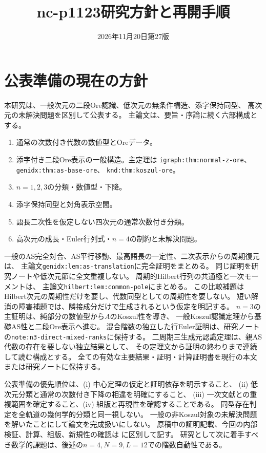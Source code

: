 \documentclass[11pt,a4paper]{ltjsarticle}
\title{nc-p1123研究方針と再開手順}
\author{}
\date{2026年11月20日\quad 第27版}
\begin{document}
\maketitle

\section{公表準備の現在の方針}
本研究は、一般次元の二段Ore認識、低次元の無条件構造、添字保持同型、
高次元の未解決問題を区別して公表する。
主論文は、要旨・序論に続く六部構成とする。
\begin{enumerate}
\item 通常の次数付き代数の数値型とOreデータ。
\item 添字付き二段Ore表示の一般構造。主定理は
\texttt{igraph:thm:normal-z-ore}、\texttt{genidx:thm:as-base-ore}、
\texttt{knd:thm:koszul-ore}。
\item $n=1,2,3$の分類・数値型・下降。
\item 添字保持同型と対角表示空間。
\item 語長二次性を仮定しない四次元の通常次数付き分類。
\item 高次元の成長・Euler行列式・$n=4$の制約と未解決問題。
\end{enumerate}
一般のAS完全対合、AS平行移動、最高語長の一定性、二次表示からの周期復元は、
主論文\texttt{genidx:lem:as-translation}に完全証明をまとめる。
同じ証明を研究ノートや低次元節に全文重複しない。
周期的Hilbert行列の共通極と一次モーメントは、
主論文\texttt{hilbert:lem:common-pole}にまとめる。
この比較補題はHilbert次元の周期性だけを要し、代数同型としての周期性を要しない。
短い解消の障害補題では、隣接成分だけで生成されるという仮定を明記する。
$n=3$の主証明は、純部分の数値型から$A$のKoszul性を導き、
一般Koszul認識定理から基礎AS性と二段Ore表示へ進む。
混合階数の独立した行Euler証明は、研究ノートの\texttt{note:n3-direct-mixed-ranks}に保持する。
二周期三生成元認識定理は、親AS代数の存在を要しない独立結果として、
その定理文から証明の終わりまで連続して読む構成とする。
全ての有効な主要結果・証明・計算証明書を現行の本文または研究ノートに保持する。

公表準備の優先順位は、(i) 中心定理の仮定と証明依存を明示すること、
(ii) 低次元分類と通常の次数付き下降の相違を明確にすること、
(iii) 一次文献との重複範囲を確定すること、(iv) 組版と再現性を確認することである。
同型存在判定を全軌道の幾何学的分類と同一視しない。
一般の非Koszul対象の未解決問題を解いたことにして論文を完成扱いにしない。
原稿中の証明記載、今回の内部検証、計算、組版、新規性の確認は
に区別して記す。
研究として次に着手すべき数学的課題は、後述の$n=4,N=9,L=12$での階数自動性である。
\end{document}
